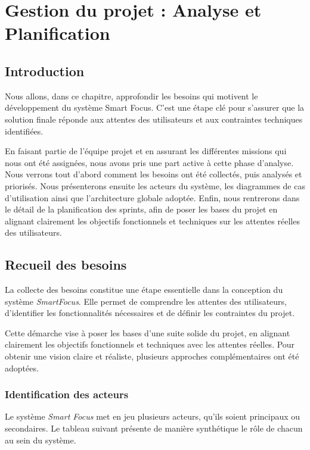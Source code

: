 
\chapter{Gestion du projet : Analyse et Planification}

\section{Introduction}
Nous allons, dans ce chapitre, approfondir les besoins qui motivent le développement du système Smart Focus. C’est une étape clé pour s’assurer que la solution finale réponde aux attentes des utilisateurs et aux contraintes techniques identifiées.

En faisant partie de l’équipe projet et en assurant les différentes missions qui nous ont été assignées, nous avons pris une part active à cette phase d’analyse. Nous verrons tout d’abord comment les besoins ont été collectés, puis analysés et priorisés. Nous présenterons ensuite les acteurs du système, les diagrammes de cas d’utilisation ainsi que l’architecture globale adoptée. Enfin, nous rentrerons dans le détail de la planification des sprints, afin de poser les bases du projet en alignant clairement les objectifs fonctionnels et techniques sur les attentes réelles des utilisateurs.
\section{Recueil des besoins}

La collecte des besoins constitue une étape essentielle dans la conception du système \textit{SmartFocus}. Elle permet de comprendre les attentes des utilisateurs, d’identifier les fonctionnalités nécessaires et de définir les contraintes du projet.

Cette démarche vise à poser les bases d’une suite solide du projet, en alignant clairement les objectifs fonctionnels et techniques avec les attentes réelles. Pour obtenir une vision claire et réaliste, plusieurs approches complémentaires ont été adoptées.
\subsection{Identification des acteurs}
Le système \textit{Smart Focus} met en jeu plusieurs acteurs, qu’ils soient principaux ou secondaires. Le tableau suivant présente de manière synthétique le rôle de chacun au sein du système.


